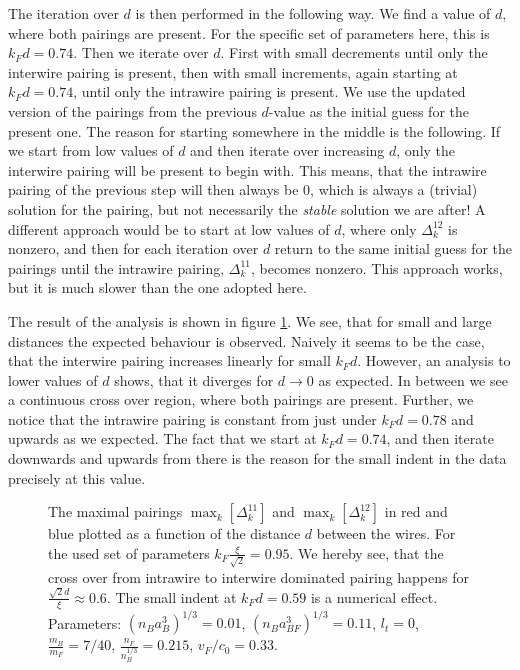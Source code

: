 The iteration over $d$ is then performed in the following way. We find a value of $d$, where both pairings are present. For the specific set of parameters here, this is $k_Fd = 0.74$. Then we iterate over $d$. First with small decrements until only the interwire pairing is present, then with small increments, again starting at $k_Fd = 0.74$, until only the intrawire pairing is present. We use the updated version of the pairings from the previous $d$-value as the initial guess for the present one. The reason for starting somewhere in the middle is the following. If we start from low values of $d$ and then iterate over increasing $d$, only the interwire pairing will be present to begin with. This means, that the intrawire pairing of the previous step will then always be $0$, which is always a (trivial) solution for the pairing, but not necessarily the \textit{stable} solution we are after! A different approach would be to start at low values of $d$, where only $\Delta^{12}_k$ is nonzero, and then for each iteration over $d$ return to the same initial guess for the pairings until the intrawire pairing, $\Delta^{11}_k$, becomes nonzero. This approach works, but it is much slower than the one adopted here.  

The result of the analysis is shown in figure \ref{fig.maximalpairingddepend}. We see, that for small and large distances the expected behaviour is observed. Naively it seems to be the case, that the interwire pairing increases linearly for small $k_Fd$. However, an analysis to lower values of $d$ shows, that it diverges for $d \to 0$ as expected. In between we see a continuous cross over region, where both pairings are present. Further, we notice that the intrawire pairing is constant from just under $k_Fd = 0.78$ and upwards as we expected. The fact that we start at $k_Fd =0.74$, and then iterate downwards and upwards from there is the reason for the small indent in the data precisely at this value.

\begin{figure} 
\begin{center}  
  
\caption{The maximal pairings $\max_k\left[\Delta^{11}_k\right]$ and $\max_k\left[\Delta^{12}_k\right]$ in red and blue plotted as a function of the distance $d$ between the wires. For the used set of parameters $k_F\frac{\xi}{\sqrt{2}} = 0.95$. We hereby see, that the cross over from intrawire to interwire dominated pairing happens for $\frac{\sqrt{2}d}{\xi} \approx 0.6$. The small indent at $k_Fd = 0.59$ is a numerical effect. Parameters: $(n_Ba_B^3)^{1/3} = 0.01$, $(n_Ba_{BF}^3)^{1/3} = 0.11$, $l_t = 0$, $\frac{m_B}{m_F} = 7/40$, $\frac{n_F}{n_B^{1/3}} = 0.215$, $v_F/c_0 = 0.33$. }  
\label{fig.maximalpairingddepend}  
\end{center}    
\end{figure}


